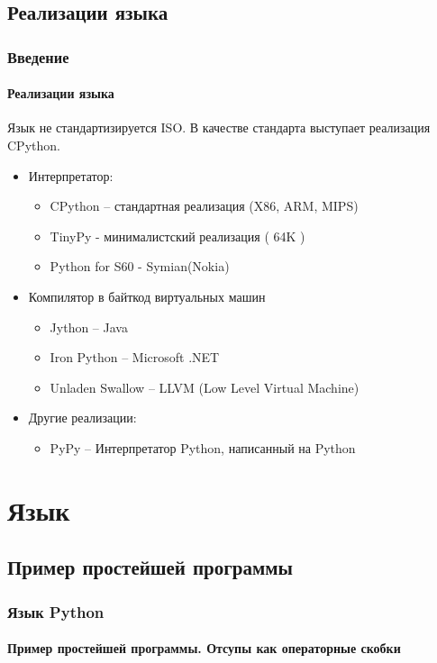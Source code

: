 \documentclass{beamer}
\begin{document}
\subsection{Реализации языка}
\begin{frame}
\frametitle{Введение}
\framesubtitle{Реализации языка}
Язык не стандартизируется ISO. В качестве стандарта выступает реализация CPython.

\begin{itemize}
  \item<1> Интерпретатор:
  	  \begin{itemize}
	    \item<1> \alert{CPython – стандартная реализация (X86, ARM, MIPS)}
	    \item<1> TinyPy -  минималистский реализация ( 64K )
	    \item<1> Python for S60 - Symian(Nokia)  
	  \end{itemize}
  \item<1> Компилятор в байткод виртуальных машин  
	\begin{itemize}
	    \item<1> Jython – Java
	    \item<1> Iron Python – Microsoft .NET
	    \item<1> Unladen Swallow – LLVM (Low Level Virtual Machine) 
    \end{itemize}

  \item<1> Другие реализации:
     \begin{itemize}
	    \item<1> PyPy – Интерпретатор Python, написанный на Python
     \end{itemize}    
\end{itemize}

\end{frame}

\section{Язык}

\subsection{Пример простейшей программы}
\begin{frame}
\frametitle{Язык Python}
\framesubtitle{Пример простейшей программы. Отсупы как операторные скобки}

\end{frame}
\end{document}
